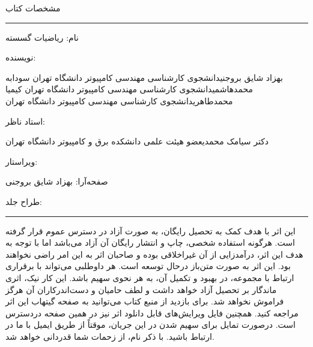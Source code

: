 \newpage
\thispagestyle{empty}
\begin{center}
    مشخصات کتاب
\end{center}

\rule{\textwidth}{0.5pt}

\scriptsize{

نام: ریاضیات گسسته

نویسنده:
\begin{AFFILIATIONS}
    \AFFILIATIONROW
    {بهزاد شایق بروجنی}{دانشجوی کارشناسی مهندسی کامپیوتر دانشگاه تهران}{}
    {سودابه محمدهاشمی}{دانشجوی کارشناسی مهندسی کامپیوتر دانشگاه تهران}{}
    {کیمیا محمدطاهری}{دانشجوی کارشناسی مهندسی کامپیوتر دانشگاه تهران}{}
\end{AFFILIATIONS}

استاد ناظر:
\begin{AFFILIATIONS}
    \AFFILIATIONROW
    {دکتر سیامک محمدی}{عضو هیئت علمی دانشکده برق و کامپیوتر دانشگاه تهران}{}
    {}{}{}
    {}{}{}
\end{AFFILIATIONS}

ویراستار:

صفحه‌آرا:
بهزاد شایق بروجنی

طراح جلد:
\href{https://pixabay.com/users/miapowterr-1721989}{}

}

\rule{\textwidth}{0.5pt}

\scriptsize{
\p
این اثر با هدف کمک به تحصیل رایگان، به صورت آزاد در دسترس عموم قرار گرفته است.
هرگونه استفاده شخصی، چاپ و انتشار رایگان آن آزاد می‌باشد اما
با توجه به هدف این اثر، درآمدزایی از آن غیراخلاقی بوده و صاحبان اثر
به این امر راضی نخواهند بود.
\p
این اثر به صورت متن‌باز درحال توسعه است. هر داوطلبی می‌تواند
با برقراری ارتباط با مجموعه، در بهبود و تکمیل آن، به هر نحوی سهیم باشد.
این کار نیک، اثری ماندگار بر تحصیل آزاد خواهد داشت و لطف
حامیان و دست‌اندرکاران آن هرگز فراموش نخواهد شد.
\p
برای بازدید از منبع کتاب می‌توانید به صفحه
گیتهاب
این اثر مراجعه کنید.
همچنین فایل ویرایش‌های قابل دانلود اثر نیز در
همین صفحه
دردسترس است.
درصورت تمایل برای سهیم شدن در این جریان،
موقتاً از طریق
ایمیل
با ما در ارتباط باشید.
با ذکر نام، از زحمات شما قدردانی خواهد شد.
}
